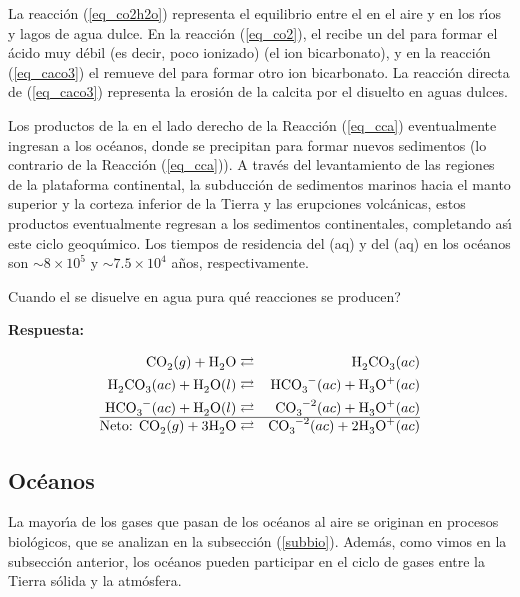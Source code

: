 La reacción (\ref{eq_co2h2o}) representa el equilibrio entre el  en el aire y en los r\'{\i}os y lagos de agua dulce. En la reacción (\ref{eq_co2}), el  recibe un   del  para formar el ácido muy débil (es decir, poco ionizado)  (el ion bicarbonato), y en la reacción (\ref{eq_caco3}) el  remueve  del  para formar otro ion bicarbonato. La reacción directa de (\ref{eq_caco3}) representa la erosión de la calcita por el   disuelto en aguas dulces.

Los productos de la  en el lado derecho de la Reacción (\ref{eq_cca}) eventualmente ingresan a los océanos, donde se precipitan para formar nuevos sedimentos (lo contrario de la Reacción (\ref{eq_cca})). A través del levantamiento de las regiones de la plataforma continental, la subducción de sedimentos marinos hacia el manto superior y la corteza inferior de la Tierra y las erupciones volcánicas, estos productos eventualmente regresan a los sedimentos continentales, completando as\'{\i} este ciclo geoqu\'{\i}mico. Los tiempos de residencia del (aq) y del (aq) en los océanos son $\sim 8\times 10^5$ y $\sim7.5 \times 10^4$ años, respectivamente.

\begin{example}
Cuando el  se disuelve en agua pura \textquestiondown qu\'e reacciones se producen?

\textbf{Respuesta:}

\begin{footnotesize}
\begin{eqnarray}
\ce{CO2}(g) + \ce{H2O} &\rightleftarrows& \ce{H2CO3}(ac) \\
\ce{H2CO3}(ac) + \ce{H2O}(l) &\rightleftarrows&  \ce{HCO3^-}(ac) + \ce{H3O^+}(ac) \\
 \ce{HCO3^-}(ac) + \ce{H2O}(l) &\rightleftarrows&  \ce{CO3^{-2}}(ac) + \ce{H3O^+}(ac) \\ \hline
 \textrm{Neto:         } \ce{CO2}(g) + 3\ce{H2O} &\rightleftarrows& \ce{CO3^{-2}}(ac) +2 \ce{H3O^+}(ac) 
 \end{eqnarray}
\end{footnotesize}
\end{example}

\subsection{Oc\'eanos}
La mayor\'{\i}a de los gases que pasan de los océanos al aire se originan en procesos biológicos, que se analizan en la subsección (\ref{subbio}). Además, como vimos en la subsección anterior, los océanos pueden participar en el ciclo de gases entre la Tierra sólida y la atmósfera. 

